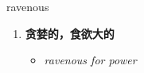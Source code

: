 
\begin{frame}
{\huge ravenous}
\begin{center}
\begin{enumerate}\Large
  \item \textbf{贪婪的，食欲大的}
  \begin{itemize}
    \item \em{\Large{ravenous for power}}
  \end{itemize}
\end{enumerate}
\end{center}
\end{frame}
